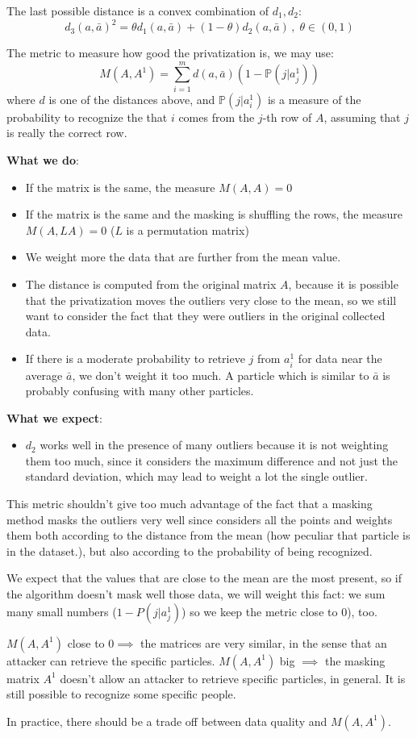 \documentclass{article}
\renewcommand{\P}{\mathbb{P}}
\begin{document}
The last possible distance is a convex combination of $d_1, d_2$:
\begin{equation}
	d_3(a, \bar{a})^2 = \theta d_1(a, \bar{a}) + (1 - \theta) d_2(a, \bar{a}) \, , \; \theta \in (0, 1)
\end{equation}

The metric to measure how good the privatization is, we may use:
\begin{equation}
	M(A, A^1) = \sum_{i=1}^{m} d(a, \bar{a}) (1 - \P(j| a_j^1) )
\end{equation}
where $d$ is one of the distances above, and $\P(j | a_i^1)$ is a measure of the probability to recognize the that $i$ comes from the $j$-th row of $A$, assuming that $j$ is really the correct row. 

\textbf{What we do}:
\begin{itemize}
	\item If the matrix is the same, the measure $M(A, A) = 0$
	\item If the matrix is the same and the masking is shuffling the rows, the measure $M(A, LA) = 0$ ($L$ is a permutation matrix)
	\item We weight more the data that are further from the mean value.
	\item The distance is computed from the original matrix $A$, because it is possible that the privatization moves the outliers very close to the mean, so we still want to consider the fact that they were outliers in the original collected data.
	\item If there is a moderate probability to retrieve $j$ from $a_i^1$ for data near the average $\bar{a}$, we don't weight it too much. A particle which is similar to $\bar{a}$ is probably confusing with many other particles.
\end{itemize}
\textbf{What we expect}:
\begin{itemize}
	\item $d_2$ works well in the presence of many outliers because it is not weighting them too much, since it considers the maximum difference and not just the standard deviation, which may lead to weight a lot the single outlier.
\end{itemize}

This metric shouldn't give too much advantage of the fact that a masking method masks the outliers very well since considers all the points and weights them both according to the distance from the mean (how peculiar that particle is in the dataset.), but also according to the probability of being recognized.

We expect that the values that are close to the mean are the most present, so if the algorithm doesn't mask well those data, we will weight this fact: we sum many small numbers ($1-P(j| a_j^1)$) so we keep the metric close to $0$), too.

$M(A,A^1)$ close to $0 \implies $ the matrices are very similar, in the sense that an attacker can retrieve the specific particles. $M(A,A^1)$ big $\implies$ the masking matrix $A^1$ doesn't allow an attacker to retrieve specific particles, in general. It is still possible to recognize some specific people.

In practice, there should be a trade off between data quality and $M(A,A^1)$.
\end{document}

